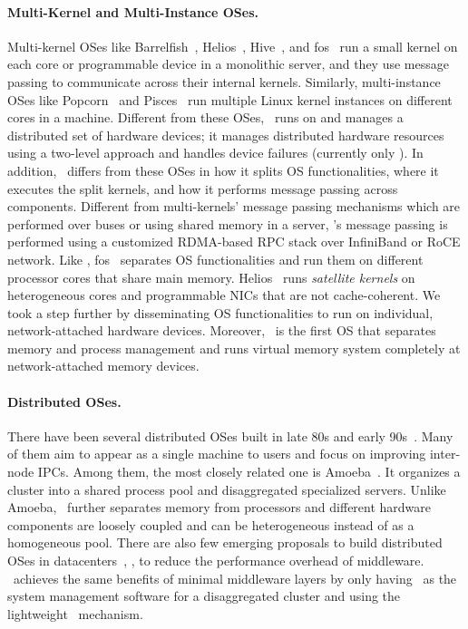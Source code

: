 \documentclass[10pt,times,twocolumn]{z2-article}
\begin{document}
{{{{{{{\paragraph{Multi-Kernel and Multi-Instance OSes.}
Multi-kernel OSes like Barrelfish~\cite{Baumann-SOSP09,Barrelfish-DC}, Helios~\cite{Helios-SOSP}, Hive~\cite{Hive-SOSP}, and fos~\cite{fos-SOCC}
run a small kernel on each core or programmable device in a monolithic server,
and they use message passing to communicate across their internal kernels.
Similarly, multi-instance OSes like Popcorn~\cite{popcorn-eurosys15} and Pisces~\cite{Pisces-hpdc15} run multiple Linux kernel instances
on different cores in a machine. %
Different from these OSes, \lego\ runs on and manages a distributed set of hardware devices;
it manages distributed hardware resources using a two-level approach and handles device failures (currently only \mcomponent).
In addition, \lego\ differs from these OSes in how it splits OS functionalities, where it executes the split kernels,
and how it performs message passing across components.
Different from multi-kernels' message passing mechanisms which are performed over buses or using shared memory in a server, 
\lego's message passing is performed using a customized RDMA-based RPC stack over InfiniBand or RoCE network.
Like \lego, fos~\cite{fos-SOCC} separates OS functionalities and run them on different processor cores that share main memory.
Helios~\cite{Helios-SOSP} runs {\em satellite kernels} on heterogeneous cores and programmable NICs that are not cache-coherent.
We took a step further by disseminating OS functionalities to run on individual, network-attached hardware devices. %
Moreover, \lego\ is the first OS that separates memory and process management and runs virtual memory system completely at network-attached memory devices.

\paragraph{Distributed OSes.}
There have been several distributed OSes built in late 80s and early 90s~\cite{Amoeba-Status,Amoeba-Experience,Sprite,MOSIX,V-System,Accent-SOSP,DEMOS-SOSP,Charlotte}.
Many of them aim to appear as a single machine to users and focus on improving inter-node IPCs. 
Among them, the most closely related one is Amoeba~\cite{Amoeba-Status,Amoeba-Experience}.
It organizes a cluster into a shared process pool and disaggregated specialized servers.
Unlike Amoeba, \lego\ further separates memory from processors and different hardware components are
loosely coupled and can be heterogeneous instead of as a homogeneous pool.
There are also few emerging proposals to build distributed OSes in datacenters~\cite{Wolfgang-hotcloud18,Schwarzkopf-apsys13}, 
\eg, to reduce the performance overhead of middleware.
\lego\ achieves the same benefits of minimal middleware layers by only 
having \lego\ as the system management software for a disaggregated cluster
and using the lightweight \vnode\ mechanism.
}}}}}}}
\end{document}
